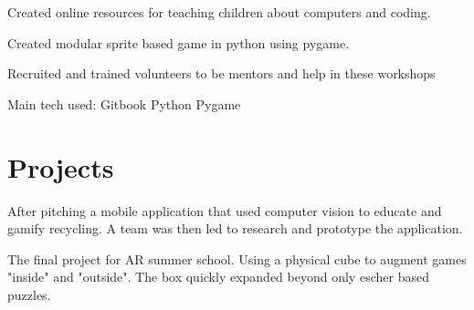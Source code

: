 \documentclass[a4paper]{deedy-resume} %
\begin{document}
\begin{minipage}[t]{0.66\textwidth}
\sectionspace %



\begin{tightitemize}
\item Created online resources for teaching children about computers and coding.
\item Created modular sprite based game in python using pygame. %
\item Recruited and trained volunteers to be mentors and help in these workshops \\
\end{tightitemize}
Main tech used: \textbullet{} Gitbook \textbullet{} Python \textbullet{} Pygame

\sectionspace %

\sectionspace
\section{Projects}


After pitching a mobile application that used computer vision to educate and gamify recycling. %
A team was then led to research and prototype the application. %

\sectionspace %



The final project for AR summer school. Using a physical cube to augment games "inside" and "outside". The box quickly expanded beyond only escher based puzzles.%
\sectionspace %


\end{minipage}
\end{document}
